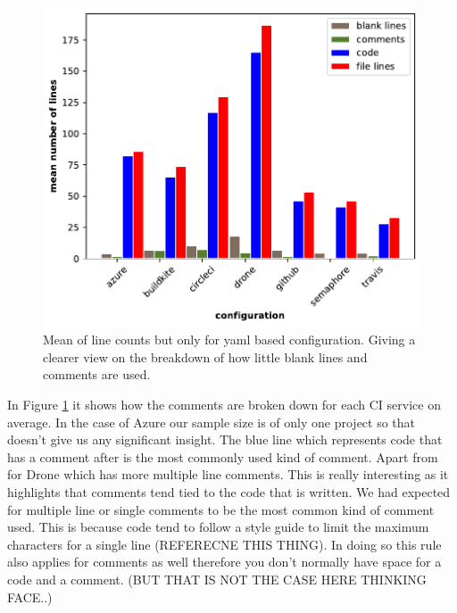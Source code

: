 \documentclass[twoside,12pt,titlepage,a4paper]{article}
\begin{document}
\begin{figure}[!ht]
  \centering
  \includegraphics[width=\textwidth]{../src/results/line structure yaml.pdf}
  \caption[alt text]{Mean of line counts but only for yaml based configuration. Giving a clearer view on the breakdown of how little blank lines and comments are used.}
  \label{fig:lines_structure_yaml}
\end{figure}

In Figure \ref{fig:lines_structure_yaml} it shows how the comments are broken down for each CI service on average. In the case of Azure our sample size is of only one project so that doesn't give us any significant insight.
The blue line which represents code that has a comment after is the most commonly used kind of comment. Apart from for Drone which has more multiple line comments. This is really interesting as it highlights that comments tend tied to the code that is written. We had expected for multiple line or single comments to be the most common kind of comment used. This is because code tend to follow a style guide to limit the maximum characters for a single line (REFERECNE THIS THING). In doing so this rule also applies for comments as well therefore you don't normally have space for a code and a comment. (BUT THAT IS NOT THE CASE HERE THINKING FACE..)
\end{document}
